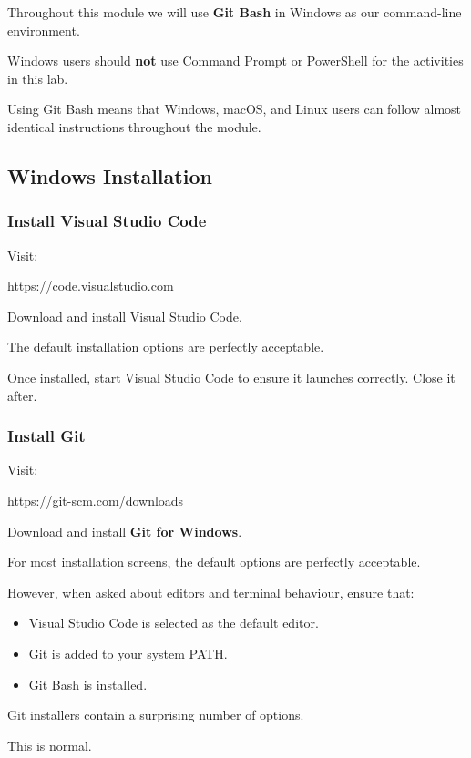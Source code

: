 \documentclass{csc2059practical}
\begin{document}
\begin{importantnote}

Throughout this module we will use \textbf{Git Bash} in Windows as our command-line environment.


Windows users should \textbf{not} use Command Prompt or PowerShell for the activities in this lab.


Using Git Bash means that Windows, macOS, and Linux users can follow almost identical instructions throughout the module.


\end{importantnote}
\subsection{Windows Installation}
\subsubsection{Install Visual Studio Code}
Visit:

\href{https://code.visualstudio.com}{https://code.visualstudio.com}

Download and install Visual Studio Code.

The default installation options are perfectly acceptable.

Once installed, start Visual Studio Code to ensure it launches correctly. Close it after.

\subsubsection{Install Git}
Visit:

\href{https://git-scm.com/downloads}{https://git-scm.com/downloads}

Download and install \textbf{Git for Windows}.

For most installation screens, the default options are perfectly acceptable.

However, when asked about editors and terminal behaviour, ensure that:

\begin{itemize}
  \item Visual Studio Code is selected as the default editor.
  \item Git is added to your system PATH.
  \item Git Bash is installed.
\end{itemize}
Git installers contain a surprising number of options.

This is normal.
\end{document}
